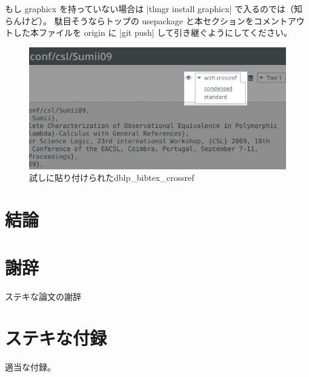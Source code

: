 \documentclass[uplatex]{sumiilab-paper}
\theoremstyle{mystyle}
\numberwithin{definition}{chapter} %
\begin{document}
もし graphicx を持っていない場合は |tlmgr install graphicx| で入るのでは（知らんけど）。
駄目そうならトップの usepackage と本セクションをコメントアウトした本ファイルを origin に |git push| して引き継ぐようにしてください。

\begin{figure}[t]
  \centering
  \includegraphics[width=.98\linewidth]{../docs/dblp_bibtex_crossref.png}
\caption{試しに貼り付けられたdblp\_bibtex\_crossref}
\label{f:aaa}
\end{figure}

\chapter{結論}


\backmatter%
\chapter{謝辞}

ステキな論文の謝辞




\appendix%
\chapter{ステキな付録}
適当な付録。
\end{document}
